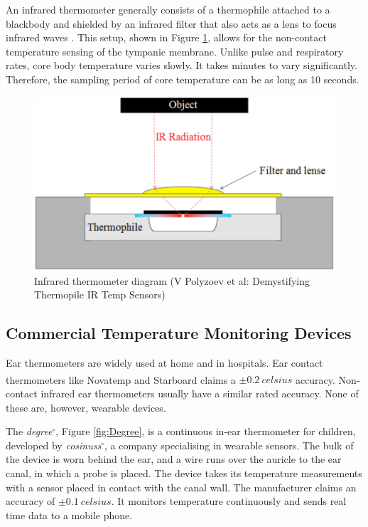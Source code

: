 \medskip

An infrared thermometer generally consists of a thermophile attached to a blackbody and shielded by an infrared filter that also acts as a lens to focus infrared waves \citep{irTempSensors}. This setup, shown in Figure \ref{fig:IR_Thermometer}, allows for the non-contact temperature sensing of the tympanic membrane. Unlike pulse and respiratory rates, core body temperature varies slowly. It takes minutes to vary significantly. Therefore, the sampling period of core temperature can be as long as 10 seconds.

\medskip

\begin{figure}
   \centering
   \includegraphics[scale=0.5]{figs/IR_Thermometer}
   \caption{Infrared thermometer diagram (V Polyzoev et al: Demystifying Thermopile IR Temp Sensors)}
   \label{fig:IR_Thermometer}
\end{figure}

\subsection{Commercial Temperature Monitoring Devices}
Ear thermometers are widely used at home and in hospitals. Ear contact thermometers like Novatemp\textsuperscript \textregistered{} and Starboard\textsuperscript \textregistered{} claims a $\pm\SI{0.2}{celsius}$ accuracy. Non-contact infrared ear thermometers usually have a similar rated accuracy. None of these are, however, wearable devices. 

\medskip
 
The \textit{degree}$^{\circ}$, Figure \ref{fig:Degree}, is a continuous in-ear thermometer for children, developed by \textit{cosinuss}$^{\circ}$, a company specialising in wearable sensors. The bulk of the device is worn behind the ear, and a wire runs over the auricle to the ear canal, in which a probe is placed. The device takes its temperature measurements with a sensor placed in contact with the canal wall. The manufacturer claims an accuracy of $\pm\SI{0.1}{celsius}$. It monitors temperature continuously and sends real time data to a mobile phone.

